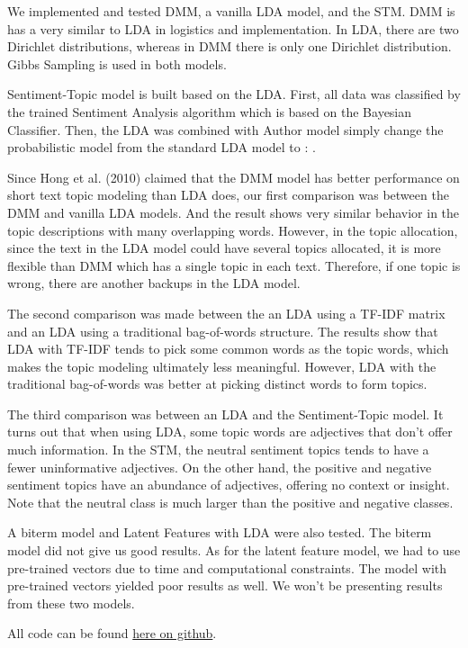 \documentclass[12pt]{amsart}
\newcommand{\0}{\mat{0}}
\newcommand{\1}{\mathds{1}}
\begin{document}
We implemented and tested DMM, a vanilla LDA model, and the STM.  DMM is has a very similar to LDA in logistics and implementation.  In LDA, there are two Dirichlet distributions, whereas in DMM there is only one Dirichlet distribution. Gibbs Sampling is used in both models.

Sentiment-Topic model is built based on the LDA. First, all data was classified by the trained Sentiment Analysis algorithm which is based on the Bayesian Classifier. Then, the LDA was combined with Author model simply change the probabilistic model from the standard LDA model to :                 .

Since Hong et al. (2010) claimed that the DMM model has better performance on short text topic modeling than LDA does, our first comparison was between the DMM and vanilla LDA models. And the result shows very similar behavior in the topic descriptions with many overlapping words. However, in the topic allocation, since the text in the LDA model could have several topics allocated, it is more flexible than DMM which has a single topic in each text. Therefore, if one topic is wrong, there are another backups in the LDA model.

The second comparison was made between the an LDA using a TF-IDF matrix and an LDA using a traditional bag-of-words structure. The results show that LDA with TF-IDF tends to pick some common words as the topic words, which makes the topic modeling ultimately less meaningful. However, LDA with the traditional bag-of-words was better at picking distinct words to form topics.

The third comparison was between an LDA and the Sentiment-Topic model. It turns out that when using LDA, some topic words are adjectives that don't offer much information. In the STM, the neutral sentiment topics tends to have a fewer uninformative adjectives. On the other hand, the positive and negative sentiment topics have an abundance of adjectives, offering no context or insight. Note that the neutral class is much larger than the positive and negative classes. 

A biterm model and Latent Features with LDA were also tested. The biterm model did not give us good results. As for the latent feature model, we had to use pre-trained vectors due to time and computational constraints. The model with pre-trained vectors yielded poor results as well. We won't be presenting results from these two models.

All code can be found \href{https://github.com/woollysocks/twitterShenanigans/tree/master/scripts}{here on github}.
\end{document}
